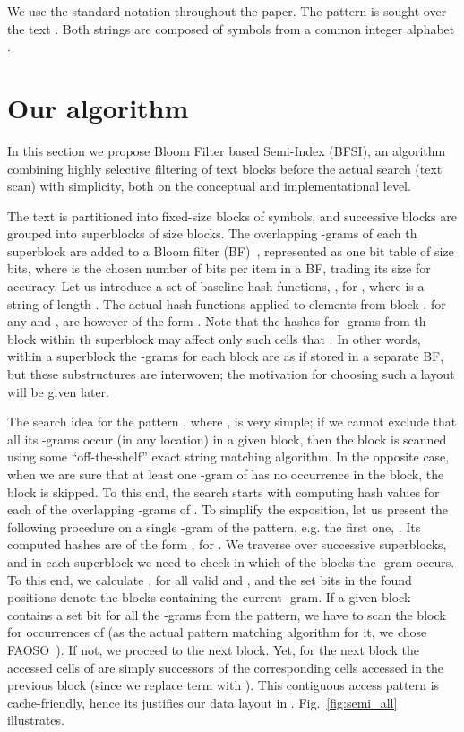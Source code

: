 \documentclass{llncs}
\begin{document}
We use the standard notation throughout the paper. 
The pattern  is sought over the text .
Both strings are composed of symbols from a common integer alphabet 
.

\section{Our algorithm}
\label{sec:alg1}

In this section we propose Bloom Filter based Semi-Index (BFSI), 
an algorithm combining highly selective filtering of text blocks 
before the actual search (text scan) 
with simplicity, 
both on the conceptual and implementational level.

The text  is partitioned into  fixed-size blocks of  symbols, 
and successive blocks are grouped into superblocks of size  blocks.
The overlapping -grams of each th superblock are added to a 
Bloom filter (BF)~\cite{Bloom1970}, 
represented as one bit table  of size  bits, 
where  is the chosen number of bits per item in a BF, 
trading its size for accuracy.
Let us introduce a set of  baseline hash functions, 
, 
for , where  is a string of length .
The actual hash functions applied to elements from block 
, for any  and , 
are however of the form .
Note that the hashes for -grams from th block within th superblock 
may affect only such  cells that .
In other words, within a superblock the -grams for each block 
are as if stored in a separate BF, 
but these  substructures are interwoven; 
the motivation for choosing such a layout will be given later.

The search idea for the pattern , where , 
is very simple;
if we cannot exclude that all its -grams occur (in any location) 
in a given block, then the block is scanned using some ``off-the-shelf'' 
exact string matching algorithm.
In the opposite case, when we are sure that at least one -gram of  
has no occurrence in the block, the block is skipped.
To this end, the search starts with computing  hash values
for each of the  overlapping -grams of .
To simplify the exposition, let us present the following procedure 
on a single -gram of the pattern, e.g. the first one, .
Its computed hashes are of the form , for 
.
We traverse over successive superblocks, and in each superblock
we need to check in which of the  blocks the -gram occurs.
To this end, we calculate , 
for all valid  and , and the set bits in the found positions denote 
the blocks containing the current -gram.
If a given block contains a set bit for all the -grams from the pattern, 
we have to scan the block for occurrences of  
(as the actual pattern matching algorithm for it, we chose FAOSO~\cite{FGjda09}).
If not, we proceed to the next block.
Yet, for the next block the accessed cells of  are simply 
successors of the corresponding cells accessed in the previous block 
(since we replace term  with ).
This contiguous access pattern is cache-friendly, hence its justifies our 
data layout in .
Fig.~\ref{fig:semi_all} illustrates.
\end{document}
